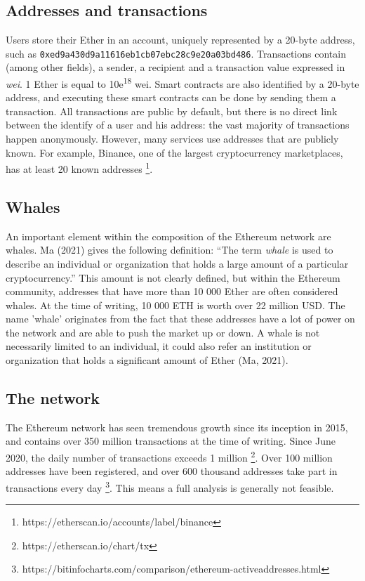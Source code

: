 \documentclass[10pt,a4paper]{article}
\begin{document}
\begin{multicols}{2}
\subsection{Addresses and transactions}
Users store their Ether in an account, uniquely represented by a 20-byte address, such as \texttt{0xed9a430d9a11616eb1cb07ebc28c9e20a03bd486}. Transactions contain (among other fields), a sender, a recipient and a transaction value expressed in \textit{wei}. 1 Ether is equal to 10e\textsuperscript{18} wei. Smart contracts are also identified by a 20-byte address, and executing these smart contracts can be done by sending them a transaction. All transactions are public by default, but there is no direct link between the identify of a user and his address: the vast majority of transactions happen anonymously. However, many services use addresses that are publicly known. For example, Binance, one of the largest cryptocurrency marketplaces, has at least 20 known addresses \footnote{https://etherscan.io/accounts/label/binance}.
\subsection{Whales}
An important element within the composition of the Ethereum network are whales. Ma (2021) gives the following definition: “The term \textit{whale} is used to describe an individual or organization that holds a large amount of a particular cryptocurrency.” This amount is not clearly defined, but within the Ethereum community, addresses that have more than 10 000 Ether are often considered whales. At the time of writing, 10 000 ETH is worth over 22 million USD. The name 'whale' originates from the fact that these addresses have a lot of power on the network and are able to push the market up or down. A whale is not necessarily limited to an individual, it could also refer an institution or organization that holds a significant amount of Ether (Ma, 2021).
\subsection{The network}
The Ethereum network has seen tremendous growth since its inception in 2015, and contains over 350 million transactions at the time of writing. Since June 2020, the daily number of transactions exceeds 1 million \footnote{https://etherscan.io/chart/tx}. Over 100 million addresses have been registered, and over 600 thousand addresses take part in transactions every day \footnote{https://bitinfocharts.com/comparison/ethereum-activeaddresses.html}. This means a full analysis is generally not feasible.


\end{multicols}
\end{document}
